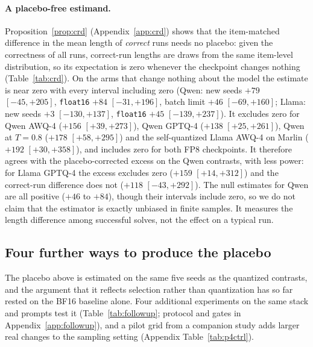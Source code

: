 \documentclass[11pt,a4paper]{article}
\begin{document}
\paragraph{A placebo-free estimand.} Proposition~\ref{prop:crd} (Appendix~\ref{app:crd}) shows that the item-matched difference in the mean length of \emph{correct} runs needs no placebo: given the correctness of all runs, correct-run lengths are draws from the same item-level distribution, so its expectation is zero whenever the checkpoint changes nothing (Table~\ref{tab:crd}). On the arms that change nothing about the model the estimate is near zero with every interval including zero (Qwen: new seeds $+79$ $[-45,+205]$, \texttt{float16} $+84$ $[-31,+196]$, batch limit $+46$ $[-69,+160]$; Llama: new seeds $+3$ $[-130,+137]$, \texttt{float16} $+45$ $[-139,+237]$). It excludes zero for Qwen AWQ-4 ($+156$ $[+39,+273]$), Qwen GPTQ-4 ($+138$ $[+25,+261]$), Qwen at $T=0.8$ ($+178$ $[+58,+295]$) and the self-quantized Llama AWQ-4 on Marlin ($+192$ $[+30,+358]$), and includes zero for both FP8 checkpoints. It therefore agrees with the placebo-corrected excess on the Qwen contrasts, with less power: for Llama GPTQ-4 the excess excludes zero ($+159$ $[+14,+312]$) and the correct-run difference does not ($+118$ $[-43,+292]$). The null estimates for Qwen are all positive ($+46$ to $+84$), though their intervals include zero, so we do not claim that the estimator is exactly unbiased in finite samples. It measures the length difference among successful solves, not the effect on a typical run.





\subsection{Four further ways to produce the placebo}
\label{sec:followup}
The placebo above is estimated on the same five seeds as the quantized contrasts, and the argument that it reflects selection rather than quantization has so far rested on the BF16 baseline alone. Four additional experiments on the same stack and prompts test it (Table~\ref{tab:followup}; protocol and gates in Appendix~\ref{app:followup}), and a pilot grid from a companion study adds larger real changes to the sampling setting (Appendix Table~\ref{tab:p4ctrl}).
\end{document}
